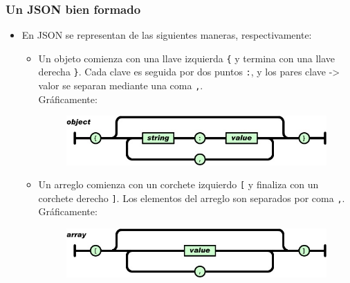 \begin{frame}
\frametitle{Un JSON bien formado}
\begin{itemize}
\item	En JSON se representan de las siguientes maneras, respectivamente:
		\pause
\begin{itemize}
		\item	Un objeto comienza con una llave izquierda \texttt{\{} y termina con una llave derecha \texttt{\}}. Cada clave es seguida por dos puntos \texttt{:}, y los pares clave -> valor se separan mediante una coma \texttt{,}. \\
				\pause
				Gráficamente: \\
				\begin{figure}
				\includegraphics[scale=0.4]{JSONObject}
				\end{figure}
				\pause
		\item	Un arreglo comienza con un corchete izquierdo \texttt{[} y finaliza con un corchete derecho \texttt{]}. Los elementos del arreglo son separados por coma \texttt{,}. \\
				\pause
				Gráficamente: \\
				\begin{figure}
				\includegraphics[scale=0.4]{JSONArray}
				\end{figure}
\end{itemize}
\end{itemize}
\end{frame}

